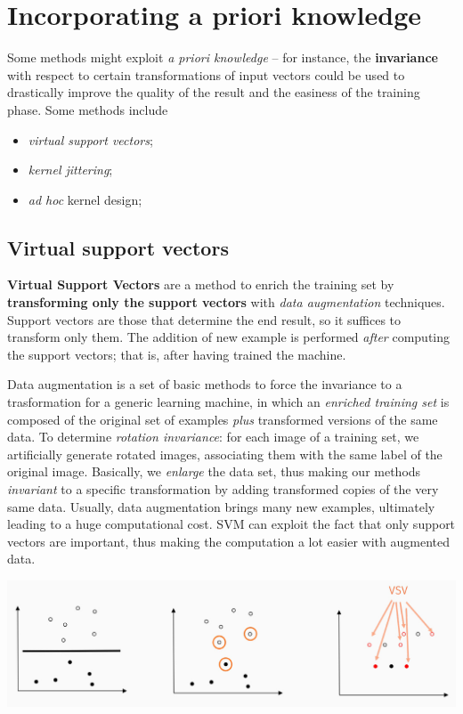 \documentclass[10pt]{report}
\begin{document}
\section{Incorporating a priori knowledge}
\label{sec:org2898bb2}
Some methods might exploit \emph{a priori knowledge} -- for instance, the
\textbf{invariance} with respect to certain transformations of input vectors could be
used to drastically improve the quality of the result and the easiness of the
training phase. Some methods include
\begin{itemize}
\item \emph{virtual support vectors};
\item \emph{kernel jittering};
\item \emph{ad hoc} kernel design;
\end{itemize}
\subsection{Virtual support vectors}
\label{sec:org096922e}
\textbf{Virtual Support Vectors} are a method to enrich the training set by
\textbf{transforming only the support vectors} with \emph{data augmentation} techniques.
Support vectors are those that determine the end result, so it suffices to
transform only them. The addition of new example is performed \emph{after} computing
 the support vectors; that is, after having trained the machine.

Data augmentation is a set of basic methods to force the invariance to a
trasformation for a generic learning machine, in which an \emph{enriched training
set} is composed of the original set of examples \emph{plus} transformed versions of
the same data. To determine \emph{rotation invariance}: for each image of a training
set, we artificially generate rotated images, associating them with the same
label of the original image. Basically, we \emph{enlarge} the data set, thus making
our methods \emph{invariant} to a specific transformation by adding transformed
copies of the very same data. Usually, data augmentation brings many new
examples, ultimately leading to a huge computational cost. SVM can exploit the
fact that only support vectors are important, thus making the computation a lot
easier with augmented data.

\begin{center}
\includegraphics[width=.9\linewidth]{./pics/svm/vsv-1.jpg}
\end{center}
\end{document}

